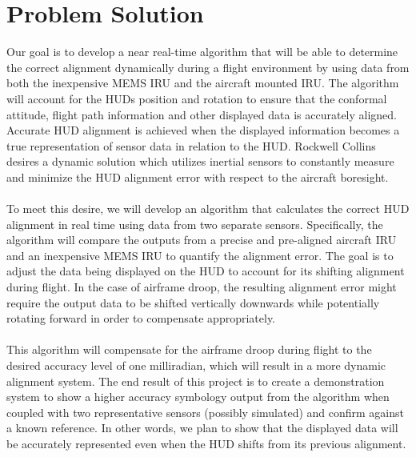 \documentclass[letterpaper,10pt,notitlepage]{article}
\begin{document}
\section*{Problem Solution}
Our goal is to develop a near real-time algorithm that will be able to determine the correct alignment dynamically during a flight environment by using data from both the inexpensive MEMS IRU and the aircraft mounted IRU. The algorithm will account for the HUD\textquotesingle s position and rotation to ensure that the conformal attitude, flight path information and other displayed data is accurately aligned. Accurate HUD alignment is achieved when the displayed information becomes a true representation of sensor data in relation to the HUD. Rockwell Collins desires a dynamic solution which utilizes inertial sensors to constantly measure and minimize the HUD alignment error with respect to the aircraft boresight.\\\\
To meet this desire, we will develop an algorithm that calculates the correct HUD alignment in real time using data from two separate sensors. Specifically, the algorithm will compare the outputs from a precise and pre-aligned aircraft IRU and an inexpensive MEMS IRU to quantify the alignment error. The goal is to adjust the data being displayed on the HUD to account for its shifting alignment during flight. In the case of airframe droop, the resulting alignment error might require the output data to be shifted vertically downwards while potentially rotating forward in order to compensate appropriately.\\\\
This algorithm will compensate for the airframe droop during flight to the desired accuracy level of one milliradian, which will result in a more dynamic alignment system. The end result of this project is to create a demonstration system to show a higher accuracy symbology output from the algorithm when coupled with two representative sensors (possibly simulated) and confirm against a known reference. In other words, we plan to show that the displayed data will be accurately represented even when the HUD shifts from its previous alignment. 
\end{document}
